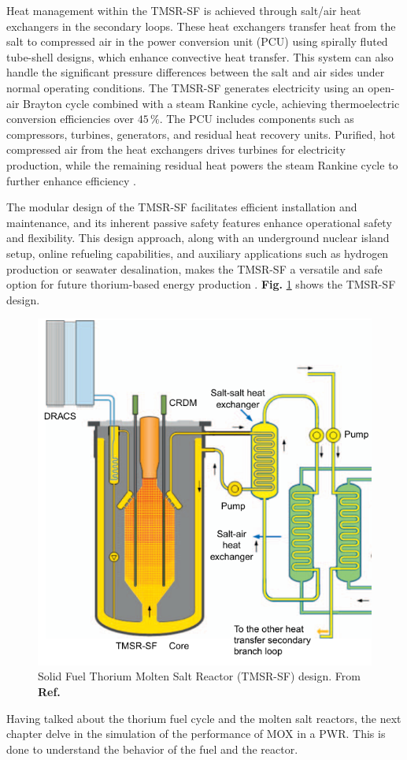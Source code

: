 Heat management within the TMSR-SF is achieved through salt/air heat exchangers in the secondary loops. These heat exchangers transfer heat from the salt to compressed air in the power conversion unit (PCU) using spirally fluted tube-shell designs, which enhance convective heat transfer. This system can also handle the significant pressure differences between the salt and air sides under normal operating conditions. The TMSR-SF generates electricity using an open-air Brayton cycle combined with a steam Rankine cycle, achieving thermoelectric conversion efficiencies over \(45 \, \%\). The PCU includes components such as compressors, turbines, generators, and residual heat recovery units. Purified, hot compressed air from the heat exchangers drives turbines for electricity production, while the remaining residual heat powers the steam Rankine cycle to further enhance efficiency \cite{TMSR_book}.

The modular design of the TMSR-SF facilitates efficient installation and maintenance, and its inherent passive safety features enhance operational safety and flexibility. This design approach, along with an underground nuclear island setup, online refueling capabilities, and auxiliary applications such as hydrogen production or seawater desalination, makes the TMSR-SF a versatile and safe option for future thorium-based energy production \cite{TMSR_book}. \textbf{Fig.} \ref{fig:TMSR-SF} shows the TMSR-SF design. 

\begin{figure}[ht]
    \centering
    \includegraphics[scale=0.5]{Kap6/Figures_Kap6/TMSR-SF.png}
    \caption{Solid Fuel Thorium Molten Salt Reactor (TMSR-SF) design. From \textbf{Ref.} \cite{TMSR_book}}
    \label{fig:TMSR-SF}
\end{figure}

Having talked about the thorium fuel cycle and the molten salt reactors, the next chapter delve in the simulation of the performance of MOX in a PWR. This is done to understand the behavior of the fuel and the reactor.